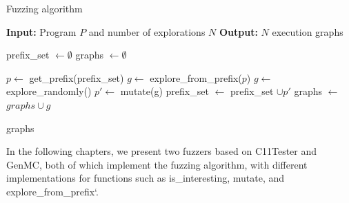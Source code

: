 \begin{algorithm}
    \caption{Fuzzing algorithm}
    \label{fuzzer}
    \begin{algorithmic}[1]
    \STATE \textbf{Input:} Program $P$ and number of explorations $N$ \label{line:input}
    \STATE \textbf{Output:} $N$ execution graphs
    
    \STATE prefix\_set $\leftarrow \emptyset$ \label{line:init_prefix}
    \STATE graphs $\leftarrow \emptyset$ 
    
            \STATE $p \leftarrow$ get\_prefix(prefix\_set) \label{line:pick_prefix}
            \STATE $g \leftarrow $ explore\_from\_prefix($p$) \label{line:explore_prefix}
        \ELSE 
            \STATE $g \leftarrow $ explore\_randomly() \label{line:random_explore}
        \ENDIF 
         \label{line:is_interesting}
            \STATE $p' \leftarrow$ mutate(g) \label{line:mutate}
            \STATE prefix\_set $\leftarrow$ prefix\_set $\cup p'$      \label{line:add_prefix}  
        \ENDIF
        \STATE graphs $\leftarrow$ $graphs \cup g$      \label{line:add_graph}
    \ENDFOR
    
    \RETURN graphs      \label{line:output}
    \end{algorithmic}
\end{algorithm}


In the following chapters, we present two fuzzers based on C11Tester and GenMC, both of which implement the fuzzing algorithm, with different implementations for functions such as is\_interesting, mutate, and explore\_from\_prefix`.













